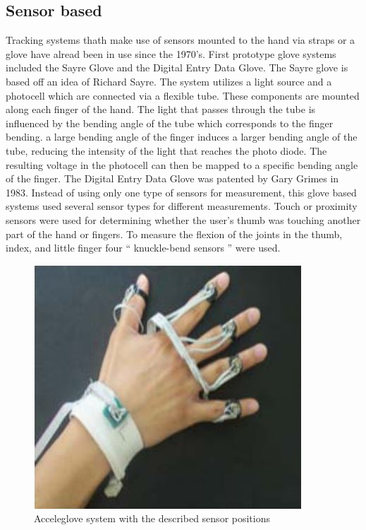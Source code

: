 \subsection{Sensor based}
\label{Sensor based}
Tracking systems thath make use of sensors mounted to the hand via straps or a glove have alread been in use since the 1970's. First prototype glove systems included the Sayre Glove\cite{ThomasA.DeFanti.1977} and the Digital Entry Data Glove\cite{Grimes.1983}.
The Sayre glove is based off an idea of Richard Sayre. The system utilizes a light source and a photocell which are connected via a flexible tube. These components are mounted along each finger of the hand. The light that passes through the tube is influenced by the bending angle of the tube which corresponds to the finger bending.
a large bending angle of the finger induces a larger bending angle of the tube, reducing the intensity of the light that reaches the photo diode. The resulting voltage in the photocell can then be mapped to a specific bending angle of the finger.
The Digital Entry Data Glove was patented by Gary Grimes in 1983. Instead of using only one type of sensors for measurement, this glove based systems used several sensor types for different measurements.
Touch or proximity sensors were used for determining whether the user's thumb was touching another part of the hand or fingers. To measure the flexion of the joints in the thumb, index, and little finger four “ knuckle-bend sensors ” were used.
\begin{figure}
\label{acceleglove}
\includegraphics[scale=0.5]{images/acceleglove.JPG} 
\caption{Acceleglove system with the described sensor positions \cite{HernandezRebollar.2002}}
\end{figure}
